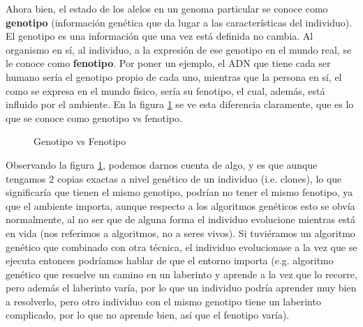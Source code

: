 Ahora bien, el estado de los alelos en un genoma particular se conoce como \textbf{genotipo} (información genética que da lugar a las características del individuo). El genotipo es una información que una vez está definida no cambia. Al organismo en sí, al individuo, a la expresión de ese genotipo en el mundo real, se le conoce como \textbf{fenotipo}. Por poner un ejemplo, el ADN que tiene cada ser humano sería el genotipo propio de cada uno, mientras que la persona en sí, el como se expresa en el mundo físico, sería su fenotipo, el cual, además, está influido por el ambiente. En la figura \ref{fig:genotypeVSphenotype} se ve esta diferencia claramente, que es lo que se conoce como genotipo vs fenotipo.

\begin{figure}[h]
    \centering
    \caption{Genotipo vs Fenotipo}
	\label{fig:genotypeVSphenotype}
\end{figure}

Observando la figura \ref{fig:genotypeVSphenotype}, podemos darnos cuenta de algo, y es que aunque tengamos 2 copias exactas a nivel genético de un individuo (i.e. clones), lo que significaría que tienen el mismo genotipo, podrían no tener el mismo fenotipo, ya que el ambiente importa, aunque respecto a los algoritmos genéticos esto se obvía normalmente, al no ser que de alguna forma el individuo evolucione mientras está en vida (nos referimos a algoritmos, no a seres vivos). Si tuviéramos un algoritmo genético que combinado con otra técnica, el individuo evolucionase a la vez que se ejecuta entonces podríamos hablar de que el entorno importa (e.g. algoritmo genético que resuelve un camino en un laberinto y aprende a la vez que lo recorre, pero además el laberinto varía, por lo que un individuo podría aprender muy bien a resolverlo, pero otro individuo con el mismo genotipo tiene un laberinto complicado, por lo que no aprende bien, así que el fenotipo varía).

